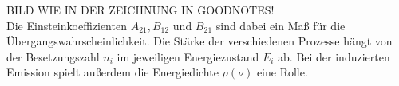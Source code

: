 BILD WIE IN DER ZEICHNUNG IN GOODNOTES!\\
Die Einsteinkoeffizienten $A_{21}, B_{12}$ und $B_{21}$ sind dabei ein Maß für die Übergangswahrscheinlichkeit.
Die Stärke der verschiedenen Prozesse hängt von der Besetzungszahl $n_i$ im jeweiligen Energiezustand $E_i$ ab.
Bei der induzierten Emission spielt außerdem die Energiedichte $\rho(\nu)$ eine Rolle.

